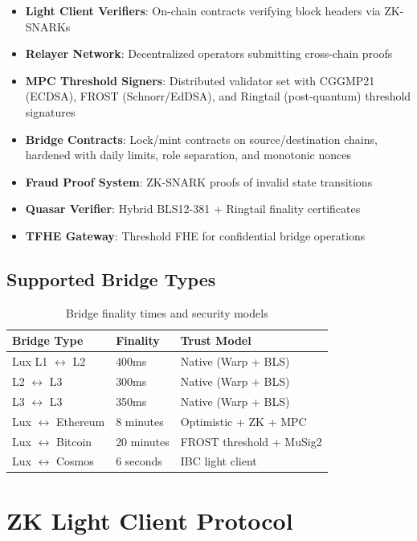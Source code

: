 \documentclass[11pt]{article}
\begin{document}
\begin{itemize}[leftmargin=1.1em]
  \item \textbf{Light Client Verifiers}: On-chain contracts verifying block headers via ZK-SNARKs
  \item \textbf{Relayer Network}: Decentralized operators submitting cross-chain proofs
  \item \textbf{MPC Threshold Signers}: Distributed validator set with CGGMP21 (ECDSA), FROST (Schnorr/EdDSA), and Ringtail (post-quantum) threshold signatures
  \item \textbf{Bridge Contracts}: Lock/mint contracts on source/destination chains, hardened with daily limits, role separation, and monotonic nonces
  \item \textbf{Fraud Proof System}: ZK-SNARK proofs of invalid state transitions
  \item \textbf{Quasar Verifier}: Hybrid BLS12-381 + Ringtail finality certificates
  \item \textbf{TFHE Gateway}: Threshold FHE for confidential bridge operations
\end{itemize}

\subsection{Supported Bridge Types}

\begin{table}[h]
\centering
\begin{tabular}{lll}
\toprule
Bridge Type & Finality & Trust Model \\
\midrule
Lux L1 $\leftrightarrow$ L2 & 400ms & Native (Warp + BLS) \\
L2 $\leftrightarrow$ L3 & 300ms & Native (Warp + BLS) \\
L3 $\leftrightarrow$ L3 & 350ms & Native (Warp + BLS) \\
Lux $\leftrightarrow$ Ethereum & 8 minutes & Optimistic + ZK + MPC \\
Lux $\leftrightarrow$ Bitcoin & 20 minutes & FROST threshold + MuSig2 \\
Lux $\leftrightarrow$ Cosmos & 6 seconds & IBC light client \\
\bottomrule
\end{tabular}
\caption{Bridge finality times and security models}
\end{table}

\section{ZK Light Client Protocol}
\end{document}
